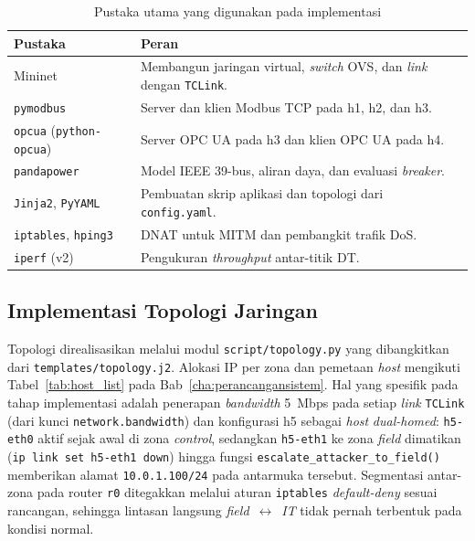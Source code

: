 \renewcommand{\arraystretch}{1.3}
\begin{table}[htbp]
    \centering
    \caption{Pustaka utama yang digunakan pada implementasi}
    \label{tab:lingkungan_pustaka}
    \begin{tabular}{|l|p{8.5cm}|}
        \hline
        \textbf{Pustaka} & \textbf{Peran} \\ \hline
        Mininet & Membangun jaringan virtual, \textit{switch} OVS, dan \textit{link} dengan \texttt{TCLink}. \\ \hline
        \texttt{pymodbus} & Server dan klien Modbus TCP pada h1, h2, dan h3. \\ \hline
        \texttt{opcua} (\texttt{python-opcua}) & Server OPC UA pada h3 dan klien OPC UA pada h4. \\ \hline
        \texttt{pandapower} & Model IEEE 39-bus, aliran daya, dan evaluasi \textit{breaker}. \\ \hline
        \texttt{Jinja2}, \texttt{PyYAML} & Pembuatan skrip aplikasi dan topologi dari \texttt{config.yaml}. \\ \hline
        \texttt{iptables}, \texttt{hping3} & \ac{DNAT} untuk \ac{MITM} dan pembangkit trafik \ac{DoS}. \\ \hline
        \texttt{iperf} (v2) & Pengukuran \textit{throughput} antar-titik \ac{DT}. \\ \hline
    \end{tabular}
\end{table}

\subsection{Implementasi Topologi Jaringan}
\label{subsec:implementasi_topologi_jaringan}
Topologi direalisasikan melalui modul \texttt{script/topology.py} yang dibangkitkan dari \texttt{templates/topology.j2}. Alokasi IP per zona dan pemetaan \textit{host} mengikuti Tabel~\ref{tab:host_list} pada Bab~\ref{cha:perancangansistem}. Hal yang spesifik pada tahap implementasi adalah penerapan \textit{bandwidth} 5~Mbps pada setiap \textit{link} \texttt{TCLink} (dari kunci \texttt{network.bandwidth}) dan konfigurasi h5 sebagai \textit{host} \textit{dual-homed}: \texttt{h5-eth0} aktif sejak awal di zona \textit{control}, sedangkan \texttt{h5-eth1} ke zona \textit{field} dimatikan (\texttt{ip link set h5-eth1 down}) hingga fungsi \texttt{escalate\_attacker\_to\_field()} memberikan alamat \texttt{10.0.1.100/24} pada antarmuka tersebut. Segmentasi antar-zona pada router \texttt{r0} ditegakkan melalui aturan \texttt{iptables} \textit{default-deny} sesuai rancangan, sehingga lintasan langsung \textit{field}~$\leftrightarrow$~\textit{IT} tidak pernah terbentuk pada kondisi normal.

